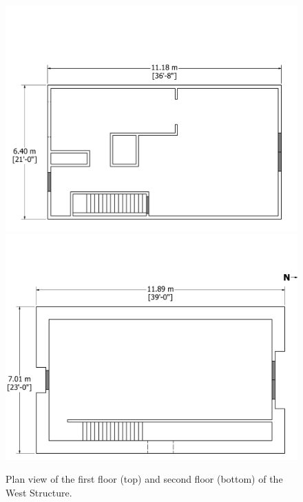 \documentclass[12pt,oneside]{book}
\begin{document}
\begin{figure}[!ht]
\includegraphics[width=6in]{../Drawings/West_Test_Structure_2nd_Floor_Dimensioned}
\includegraphics[width=6in]{../Drawings/West_Test_Structure_1st_Floor_Dimensioned}
\caption[Plan view of the second floor and first floor of the West Structure.]{Plan view of the first floor (top) and second floor (bottom) of the West Structure.}
\label{fig:west_general_plan}
\end{figure}

\clearpage
\end{document}

